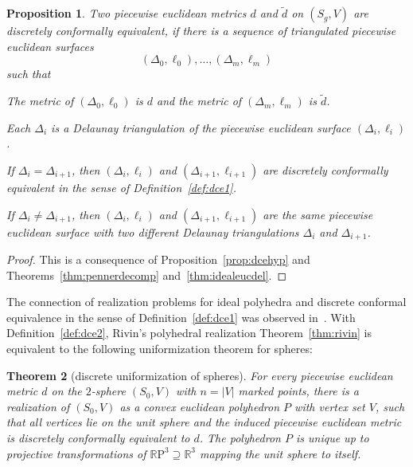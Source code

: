 \documentclass[a4paper, 11pt]{article}
\newcommand{\R}{\mathbb{R}}
\newcommand{\dtil}{\tilde{d}}
\newcommand{\RP}{\R\mathrm{P}}
\theoremstyle{plain}
\newtheorem{theorem}{Theorem}[section]
\newtheorem{proposition}[theorem]{Proposition}
\theoremstyle{definition}
\begin{document}
\begin{proposition}
  Two piecewise euclidean metrics $d$ and $\dtil$ on $(S_{g},V)$ are
  \emph{discretely conformally equivalent}, if there is a sequence of
  triangulated piecewise euclidean surfaces 
  \begin{equation*}
    (\Delta_{0},\ell_{0}),\ldots,(\Delta_{m},\ell_{m})
  \end{equation*}
  such that 
  \begin{compactenum}[(i)]
  \item The metric of $(\Delta_{0},\ell_{0})$ is $d$ and the metric of
    $(\Delta_{m},\ell_{m})$ is $\dtil$.
  \item Each $\Delta_{i}$ is a Delaunay triangulation of the piecewise
    euclidean surface $(\Delta_{i},\ell_{i})$.
  \item If $\Delta_{i}=\Delta_{i+1}$, then $(\Delta_{i},\ell_{i})$ and
    $(\Delta_{i+1},\ell_{i+1})$ are discretely conformally equivalent
    in the sense of Definition~\ref{def:dce1}.
  \item If $\Delta_{i}\not=\Delta_{i+1}$, then $(\Delta_{i},\ell_{i})$
    and $(\Delta_{i+1},\ell_{i+1})$ are the same piecewise euclidean
    surface with two different Delaunay triangulations $\Delta_{i}$
    and $\Delta_{i+1}$.
  \end{compactenum}
\end{proposition}

\begin{proof}
  This is a consequence of Proposition~\ref{prop:dcehyp} and
  Theorems~\ref{thm:pennerdecomp} and~\ref{thm:idealeucdel}.
\end{proof}

The connection of realization problems for ideal polyhedra and
discrete conformal equivalence in the sense of
Definition~\ref{def:dce1} was observed
in~\cite[Sec.~5.4]{bobenko15}. With Definition~\ref{def:dce2}, Rivin's
polyhedral realization Theorem~\ref{thm:rivin} is equivalent to the
following uniformization theorem for spheres:

\begin{theorem}[discrete uniformization of spheres]
  \label{thm:unisphere}
  For every piecewise euclidean metric $d$ on the $2$-sphere
  $(S_{0},V)$ with $n=|V|$ marked points, there is a realization of
  $(S_{0},V)$ as a convex euclidean polyhedron $P$ with vertex set
  $V$, such that all vertices lie on the unit sphere and the induced
  piecewise euclidean metric is discretely conformally equivalent to
  $d$. The polyhedron $P$ is unique up to projective transformations
  of $\RP^{3}\supseteq\R^{3}$ mapping the unit sphere to itself.
\end{theorem}
\end{document}
